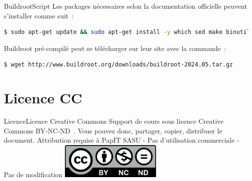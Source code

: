 \documentclass{beamer}
\begin{document}
    \begin{frame}[fragile]{Buildroot}{Script}
        Les packages nécessaires selon la documentation officielle peuvent s'installer comme suit~:
        \begin{lstlisting}[language=bash]
$ sudo apt-get update && sudo apt-get install -y which sed make binutils build-essential diffutils gcc g++ bash patch gzip bzip2 perl tar cpio unzip rsync file bc findutils wget python3 libncurses5-dev qt5-qmake libglib2.0-dev libgtk2.0-dev libglade2-dev bzr cvs git mercurial openssh-client subversion openjdk-11-jdk asciidoc w3m dblatex graphviz python3-matplotlib python3-aiohttp
        \end{lstlisting}
        Buildroot pré-compilé peut se télécharger sur leur site avec la commande~:
        \begin{lstlisting}[language=bash]
$ wget http://www.buildroot.org/downloads/buildroot-2024.05.tar.gz
        \end{lstlisting}
    \end{frame}


    \section{Licence CC}\label{sec:licence}

    \begin{frame}{Licence}{Licence Creative Commons}
        Support de cours sous licence Creative Commons BY-NC-ND~.
        \bigbreak
        Vous pouvez donc, partager, copier, distribuer le document.
        \bigbreak
        Attribution requise à PapIT SASU - Pas d’utilisation commerciale - Pas de modification
        \bigbreak
        \centering
        \includegraphics[width=5cm]{image/by-nc-nd-logo}
    \end{frame}
\end{document}
